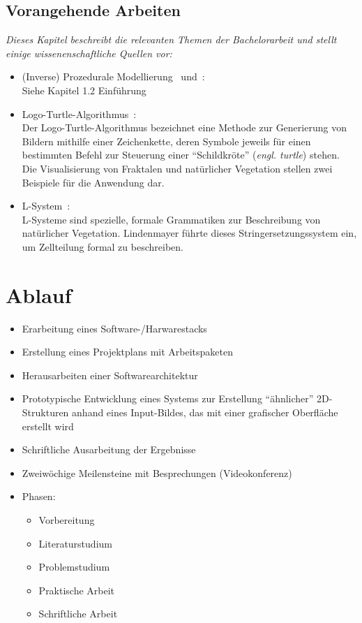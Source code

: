 \documentclass[11pt]{article}
\begin{document}
    \subsection{Vorangehende Arbeiten}
    \textit{Dieses Kapitel beschreibt die relevanten Themen der Bachelorarbeit und stellt einige wissenenschaftliche
    Quellen vor:}
    \begin{itemize}
        \item (Inverse) Prozedurale Modellierung~\cite{2} und~\cite{1}:\\Siehe Kapitel 1.2 Einführung
        \item Logo-Turtle-Algorithmus~\cite{3}:\\ Der Logo-Turtle-Algorithmus bezeichnet eine Methode zur Generierung
        von Bildern mithilfe einer Zeichenkette, deren Symbole jeweils für einen bestimmten Befehl zur Steuerung einer
        "`Schildkröte"' (\textit{engl. turtle}) stehen.
        Die Visualisierung von Fraktalen und natürlicher Vegetation stellen zwei Beispiele für die Anwendung dar.
        \item L-System~\cite{5}:\\ L-Systeme sind spezielle, formale Grammatiken zur Beschreibung von
        natürlicher Vegetation.
        Lindenmayer führte dieses Stringersetzungssystem ein, um Zellteilung formal zu beschreiben.
    \end{itemize}

    \newpage

    \begin{itemize}

    \end{itemize}

    \section{Ablauf}
    \begin{itemize}
        \item Erarbeitung eines Software-/Harwarestacks
        \item Erstellung eines Projektplans mit Arbeitspaketen
        \item Herausarbeiten einer Softwarearchitektur
        \item Prototypische Entwicklung eines Systems zur Erstellung "`ähnlicher"' 2D-Strukturen anhand eines
        Input-Bildes, das mit einer grafischer Oberfläche erstellt wird
        \item Schriftliche Ausarbeitung der Ergebnisse
        \item Zweiwöchige Meilensteine mit Besprechungen (Videokonferenz)
        \item Phasen:
        \begin{itemize}
            \item Vorbereitung
            \item Literaturstudium
            \item Problemstudium
            \item Praktische Arbeit
            \item Schriftliche Arbeit
        \end{itemize}
    \end{itemize}
\end{document}
